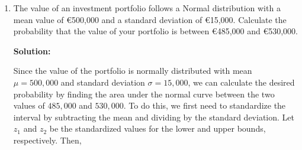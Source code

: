 \documentclass[12pt]{article}
\begin{document}
\begin{enumerate}
{\begin{enumerate}
Step 6: Calculate the sample correlation coefficient \( r_{xy} \):
The sample correlation coefficient is given by:
\[
r_{xy} = \frac{s_{xy}}{s_x \cdot s_y} = \frac{-0.2199}{1.483 \times \sqrt{0.2518}} \approx -0.282.
\]

So, the sample covariance is \( -0.2199 \) and the sample correlation coefficient is \( -0.282 \).

\item Justify if the variables \( X \) and \( Y \) are independent:

The sample correlation coefficient \( r_{xy} = -0.282 \) indicates a weak negative linear relationship. However, **correlation alone cannot be used to claim independence**. Independence would require all joint distributions to be considered, not just linear relationships.

\item Interpret the coefficients \( a \) and \( b \) from an economic perspective:

\begin{itemize}
    \item The intercept \( a = 2 \) represents the predicted inflation rate when the unemployment rate is zero. In economic terms, even with no unemployment, there is still some expected inflation (2%
    \item The slope \( b = -0.1 \) indicates that for each 1\% increase in the unemployment rate, inflation is expected to decrease by 0.1\%. This is consistent with the inverse relationship described by the Phillips curve, which suggests that higher unemployment typically leads to lower inflation.
\end{itemize}

\end{enumerate}

}


\item   The value of an investment portfolio follows a Normal distribution with a mean value of €500,000 and a standard deviation of €15,000. Calculate the probability that the value of your portfolio is between €485,000 and €530,000.

{\color{blue}
\noindent \textbf{Solution:}

Since the value of the portfolio is normally distributed with mean $\mu = 500,000$ and standard deviation $\sigma = 15,000$, we can calculate the desired probability by finding the area under the normal curve between the two values of $485,000$ and $530,000$. To do this, we first need to standardize the interval by subtracting the mean and dividing by the standard deviation. Let $z_1$ and $z_2$ be the standardized values for the lower and upper bounds, respectively. Then,

}
\end{enumerate}
\end{document}
